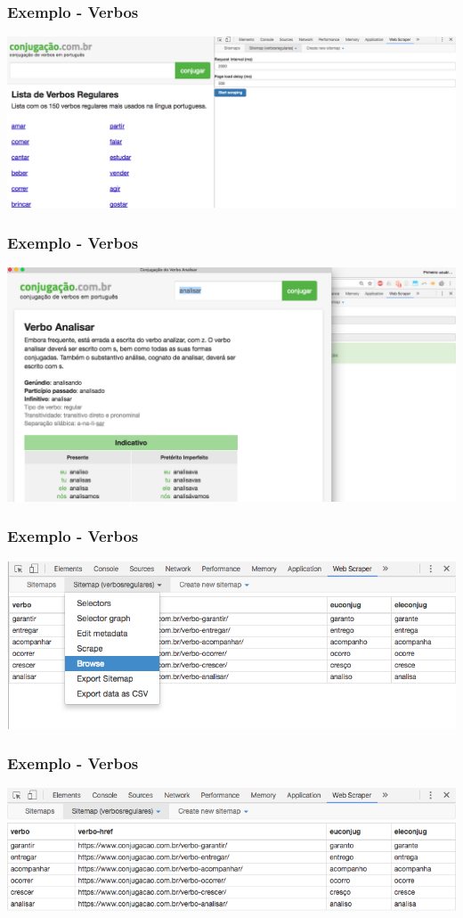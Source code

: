 \documentclass{beamer}
\begin{document}
\begin{frame}
\frametitle{Exemplo - Verbos}
\includegraphics[width=\textwidth]{Screen_Shot_2017-10-05_at_22_54_20.png}
\end{frame}

\begin{frame}
\frametitle{Exemplo - Verbos}
\includegraphics[width=\textwidth]{Screen_Shot_2017-10-05_at_22_56_54.png}
\end{frame}

\begin{frame}
\frametitle{Exemplo - Verbos}
\includegraphics[width=\textwidth]{Screen_Shot_2017-10-05_at_22_57_15.png}
\end{frame}

\begin{frame}
\frametitle{Exemplo - Verbos}
\includegraphics[width=\textwidth]{Screen_Shot_2017-10-05_at_22_57_22.png}
\end{frame}
\end{document}
